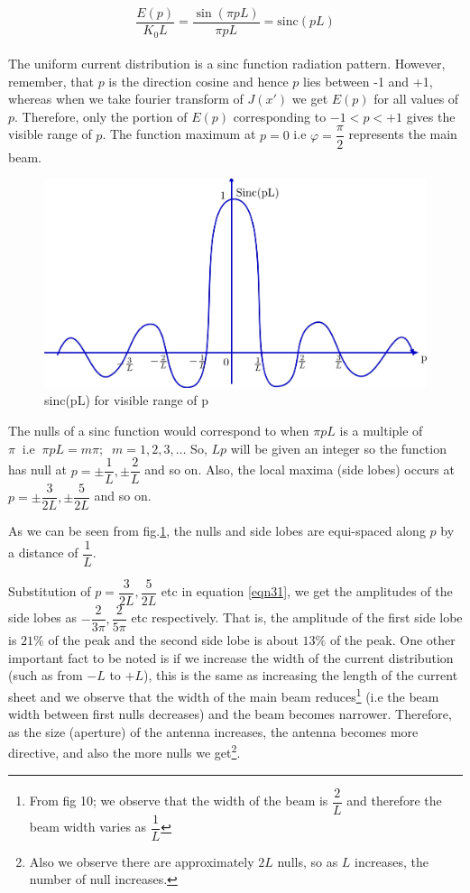 \begin{equation}
\dfrac{E(p)}{K_0 L} = \dfrac{\sin(\pi pL)}{\pi pL} = \text{sinc}(pL)
\end{equation}
\\
The uniform current distribution is a sinc function radiation pattern. However, remember, that $p$ is the direction cosine and hence $p$ lies between -1 and +1, whereas when we take fourier transform of $J(x')$ we get $E(p)$ for all values of $p$. Therefore, only the portion of $E(p)$ corresponding to $-1 < p < +1$ gives the visible range of $p$. The function maximum at $p = 0$ i.e $\varphi = \dfrac{\pi}{2}$ represents the main beam.

\begin{figure}[h]
\centering
\includegraphics[width=1\linewidth]{./graphics/n10}
\caption{sinc(pL) for visible range of p}
\label{fig10}
\end{figure}

The nulls of a sinc function would correspond to when $\pi pL$ is a multiple of $\pi \; \; \text{i.e} \; \; \pi pL = m\pi ; \; \; m = 1, 2, 3, \ldots$ So, $Lp$ will be given an integer so the function has null at $p = \pm\dfrac{1}{L}, \pm\dfrac{2}{L}$ and so on. Also, the local maxima (side lobes) occurs at $p = \pm\dfrac{3}{2L}, \pm\dfrac{5}{2L}$ and so on.

As we can be seen from fig.\ref{fig10}, the nulls and side lobes are equi-spaced along $p$ by a distance of $\dfrac{1}{L}$.

Substitution of $p = \dfrac{3}{2L}, \dfrac{5}{2L}$ etc in equation \ref{eqn31}, we get the amplitudes of the side lobes as $-\dfrac{2}{3\pi}, \dfrac{2}{5\pi}$ etc respectively. That is, the amplitude of the first side lobe is $21\% $ of the peak and the second side lobe is about $13\%$ of the peak. One other important fact to be noted is if we increase the width of the current distribution (such as from $-L$ to $+L$), this is the same as increasing the length of the current sheet and we observe that the width of the main beam reduces\footnote{From fig 10; we observe that the width of the beam is $\dfrac{2}{L}$ and therefore the beam width varies as $\dfrac{1}{L}$} (i.e the beam width between first nulls decreases) and the beam becomes narrower. Therefore, as the size (aperture) of the antenna increases, the antenna becomes more directive, and also the more nulls we get\footnote{Also we observe there are approximately $2L$ nulls, so as $L$ increases, the number of null increases.}.


